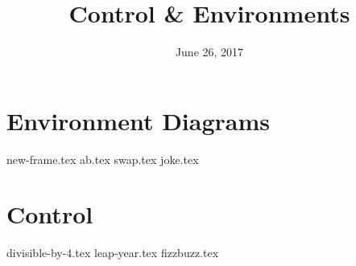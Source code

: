\documentclass{exam}
\title{Control \& Environments}
\date{June 26, 2017}
\begin{document}
\maketitle
\section{Environment Diagrams}
\begin{questions}
{new-frame.tex}
{ab.tex}
{swap.tex}
{joke.tex}
\end{questions}

\section{Control}
\begin{questions}
{divisible-by-4.tex}
{leap-year.tex}
{fizzbuzz.tex}
\end{questions}
\end{document}
